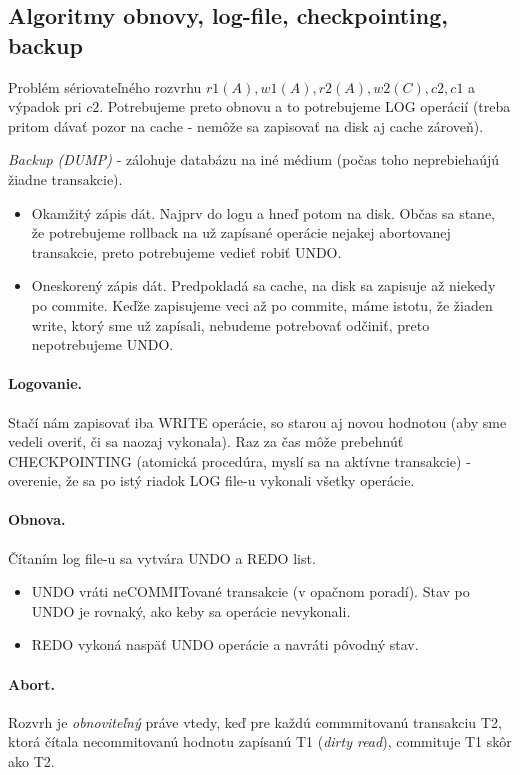 \documentclass[10pt,a4paper]{article}
\begin{document}
\subsection{Algoritmy obnovy, log-file, checkpointing, backup}

Problém sériovateľného rozvrhu $r1(A), w1(A), r2(A), w2(C), c2, c1$ a výpadok pri $c2$.
Potrebujeme preto obnovu a to potrebujeme LOG operácií (treba pritom dávať pozor na cache - nemôže sa zapisovať na disk aj cache zároveň).

\emph{Backup (DUMP)} - zálohuje databázu na iné médium (počas toho neprebiehaújú žiadne transakcie).

\begin{itemize}
\item Okamžitý zápis dát. Najprv do logu a hneď potom na disk. Občas sa
      stane, že potrebujeme rollback na už zapísané operácie nejakej
      abortovanej transakcie, preto potrebujeme vedieť robiť UNDO.
\item Oneskorený zápis dát. Predpokladá sa cache, na disk sa zapisuje až
      niekedy po commite. Keďže zapisujeme veci až po commite, máme
      istotu, že žiaden write, ktorý sme už zapísali, nebudeme potrebovať
      odčiniť, preto nepotrebujeme UNDO.
\end{itemize}

\paragraph{Logovanie.}
Stačí nám zapisovať iba WRITE operácie, so starou aj novou hodnotou (aby sme vedeli overiť, či sa naozaj vykonala).
Raz za čas môže prebehnúť CHECKPOINTING (atomická procedúra, myslí sa na aktívne transakcie) - overenie, že sa po istý riadok LOG file-u vykonali všetky operácie.

\paragraph{Obnova.}
Čítaním log file-u sa vytvára UNDO a REDO list.

\begin{itemize}
\item UNDO vráti neCOMMITované transakcie (v opačnom poradí). Stav po UNDO je rovnaký, ako keby sa operácie nevykonali.
\item REDO vykoná naspäť UNDO operácie a navráti pôvodný stav.
\end{itemize}

\paragraph{Abort.}
Rozvrh je \emph{obnoviteľný} práve vtedy, keď pre každú commmitovanú transakciu T2, ktorá čítala necommitovanú hodnotu zapísanú T1 (\emph{dirty read}), commituje T1 skôr ako T2.
\end{document}
